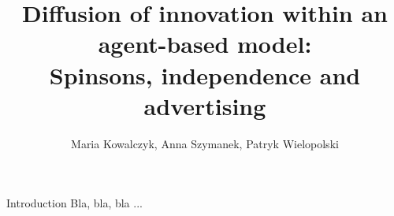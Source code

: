 \documentclass[10pt]{beamer}
\title{Diffusion of innovation within an agent-based model: \\ Spinsons, independence and advertising}
\author{Maria Kowalczyk, Anna Szymanek, Patryk Wielopolski}
\institute{Wrocław Univeristy of Technology and Science}
\date{}
\begin{document}
\maketitle

\begin{frame}{Introduction}
	Bla, bla, bla ...
\end{frame}{}
\end{document}
